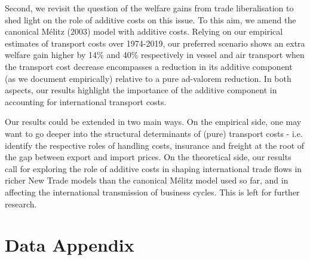 \documentclass[a4paper,11pt]{article}
\begin{document}
Second, we revisit the question of the welfare gains from trade liberalisation to shed light on the role of additive costs on this issue. To this aim, we amend the canonical M\'{e}litz (2003) model with additive costs. Relying on our empirical estimates of transport
costs over 1974-2019, our preferred scenario shows an extra welfare gain higher by 14\% and 40\% respectively in vessel and air transport when the transport cost decrease encompasses a reduction in its additive
component (as we document empirically) relative to a pure ad-valorem reduction. In both aspects, our results highlight the importance of the additive component in accounting for international transport costs.

Our results could be extended in two main ways.
On the empirical side, one may want to go deeper into the structural determinants of (pure) transport costs - i.e.
identify the respective roles of handling costs, insurance and freight at the root of the gap between export and import prices.
On the theoretical side, our results call for exploring the role of additive costs in shaping international trade flows in richer New Trade models than the canonical M\'{e}litz model used so far, and in affecting the international transmission of business cycles.
This is left for further research.



\newpage




\newpage


\appendix

\clearpage

\setcounter{table}{0}
\renewcommand{\thefigure}{A.\arabic{figure}}
\renewcommand{\thetable}{A.\arabic{table}}


\section{Data Appendix \label{app:data}}
\end{document}
